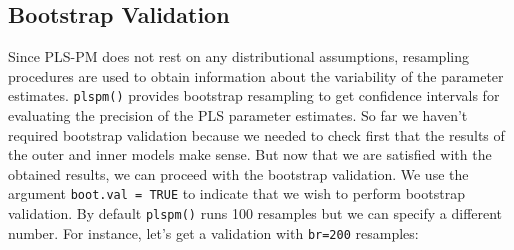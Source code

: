 \documentclass[12pt]{book}\usepackage{graphicx, color}
\newcommand{\fplspm}{\texttt{plspm()}}
\newcommand{\code}[1]{\texttt{#1}}
\begin{document}
\subsection{Bootstrap Validation}
Since PLS-PM does not rest on any distributional assumptions, resampling procedures are used to obtain information about the variability of the parameter estimates. \fplspm{} provides bootstrap resampling to get confidence intervals for evaluating the precision of the PLS parameter estimates. 
So far we haven't required bootstrap validation because we needed to check first that the results of the outer and inner models make sense. But now that we are satisfied with the obtained results, we can proceed with the bootstrap validation. We use the argument \code{boot.val = TRUE} to indicate that we wish to perform bootstrap validation. By default \fplspm{} runs 100 resamples but we can specify a different number. For instance, let's get a validation with \code{br=200} resamples:
\end{document}
